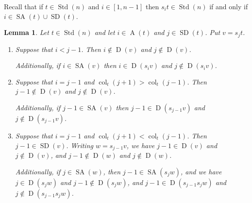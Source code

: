 \documentclass[10pt]{amsart}
\newtheorem{lemm}[theo]{Lemma}
\theoremstyle{definition}
\DeclareMathOperator{\col}{col}
\DeclareMathOperator{\STD}{Std}
\DeclareMathOperator{\SD}{SD}
\DeclareMathOperator{\SA}{SA}
\DeclareMathOperator{\D}{D}
\DeclareMathOperator{\A}{A}
\begin{document}
Recall that if $t\in\STD(n)$ and $i\in[1,n-1]$ then $s_it\in\STD(n)$ if and only if
$i\in\SA(t)\cup\SD(t)$.

\begin{lemm}\label{variousaltpaths}
Let $t\in\STD(n)$ and let $i\in\A(t)$ and $j\in\SD(t)$. Put $v=s_jt$.
\begin{enumerate}[label=(\roman*),topsep=1 pt]
\item\label{lemma7.29_i} Suppose that $i<j-1$. Then $i\notin\D(v)$ and $j\notin\D(v)$.

\noindent
Additionally, if $i\in\SA(v)$ then $i\in\D(s_{i}v)$ and $j\notin\D(s_{i}v)$.
\item\label{lemma7.29_ii} Suppose that $i=j-1$ and $\col_t(j+1)>\col_t(j-1)$.
Then $j-1\notin\D(v)$ and $j\notin\D(v)$.

\noindent
Additionally, if $j-1\in\SA(v)$ then
$j-1\in\D(s_{j-1}v)$ and $j\notin\D(s_{j-1}v)$.
\item\label{lemma7.29_iii} Suppose that $i=j-1$ and $\col_t(j+1)<\col_t(j-1)$. Then
$j-1\in\SD(v)$. Writing $w=s_{j-1}v$, we have
$j-1\in\D(v)$ and $j\notin\D(v)$, and $j-1\notin\D(w)$ and
$j\notin\D(w)$.

\noindent
Additionally, if $j\in\SA(w)$, then $j-1\in\SA(s_jw)$,
and we have $j\in\D(s_jw)$ and $j-1\notin\D(s_{j}w)$, and
$j-1\in\D(s_{j-1}s_jw)$ and $j\notin\D(s_{j-1}s_jw)$.
\end{enumerate}
\end{lemm}
\end{document}
